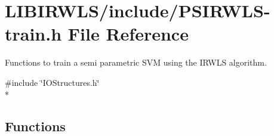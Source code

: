 \hypertarget{PSIRWLS-train_8h}{}\section{L\+I\+B\+I\+R\+W\+L\+S/include/\+P\+S\+I\+R\+W\+L\+S-\/train.h File Reference}
\label{PSIRWLS-train_8h}


Functions to train a semi parametric S\+VM using the I\+R\+W\+LS algorithm.  


{\ttfamily \#include \char`\"{}I\+O\+Structures.\+h\char`\"{}}\\*
\subsection*{Functions}
